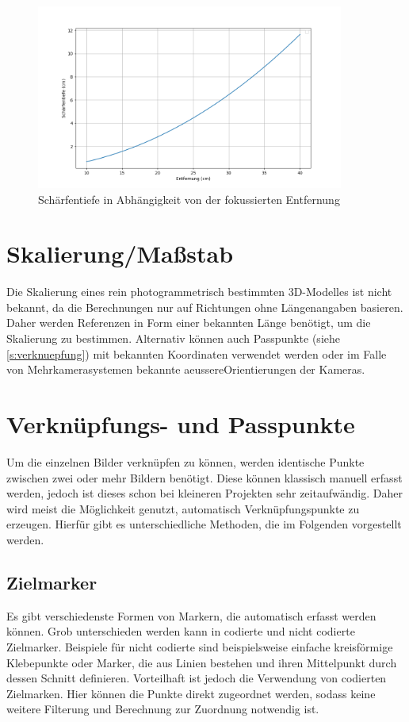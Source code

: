 \documentclass[./00PhotoBox.tex]{subfiles}
\begin{document}
\begin{figure}
    \centering
    \includegraphics[width=0.9\textwidth]{./img/schaerfentiefe_plot.png}
    \caption{Schärfentiefe in Abhängigkeit von der fokussierten Entfernung} %
    \label{img:sschaerfentiefe_plot} %
\end{figure}


\section{Skalierung/Maßstab}
\label{sec:massstab}
Die Skalierung eines rein photogrammetrisch bestimmten 3D-Modelles ist nicht bekannt, da die Berechnungen nur auf Richtungen ohne Längenangaben basieren. Daher werden Referenzen in Form einer bekannten Länge benötigt, um die Skalierung zu bestimmen. Alternativ können auch Passpunkte (siehe \autoref{s:verknuepfung}) mit bekannten Koordinaten verwendet werden oder im Falle von Mehrkamerasystemen bekannte \gls{aeussereOrientierung}en der Kameras. \citep[S. 546]{luhmann}


\section{Verknüpfungs- und Passpunkte}
\label{s:verknuepfung}
Um die einzelnen Bilder verknüpfen zu können, werden identische Punkte zwischen zwei oder mehr Bildern benötigt. Diese können klassisch manuell erfasst werden, jedoch ist dieses schon bei kleineren Projekten sehr zeitaufwändig. Daher wird meist die Möglichkeit genutzt, automatisch Verknüpfungspunkte zu erzeugen. Hierfür gibt es unterschiedliche Methoden, die im Folgenden vorgestellt werden.


\subsection{Zielmarker}
Es gibt verschiedenste Formen von Markern, die automatisch erfasst werden können. Grob unterschieden werden kann in codierte und nicht codierte Zielmarker. Beispiele für nicht codierte sind beispielsweise einfache kreisförmige Klebepunkte oder Marker, die aus Linien bestehen und ihren Mittelpunkt durch dessen Schnitt definieren.
Vorteilhaft ist jedoch die Verwendung von codierten Zielmarken. Hier können die Punkte direkt zugeordnet werden, sodass keine weitere Filterung und Berechnung zur Zuordnung notwendig ist. \citep[S.535ff]{luhmann}
\end{document}

